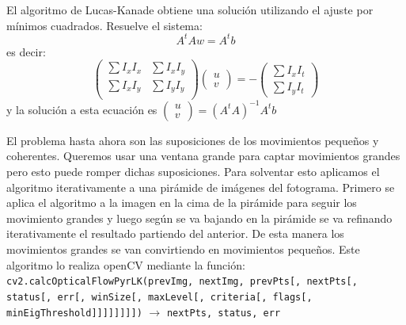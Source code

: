 \documentclass[a4paper,openright, 12pt]{book}
\begin{document}
El algoritmo de Lucas-Kanade obtiene una solución utilizando el ajuste por mínimos cuadrados. Resuelve el sistema:
\begin{equation*}
A^t Aw=A^t b
\end{equation*}
es decir:
\begin{equation*}
\left(
\begin{matrix}
\sum I_x I_x & \sum I_x I_y\\
\sum I_x I_y & \sum I_y I_y\\
\end{matrix}
\right)
\left(\begin{array}{c}u\\v\end{array}\right)
=
- \left(\begin{array}{c} \sum I_x I_t\\ \sum I_y I_t\end{array}\right)
\end{equation*}
y la solución a esta ecuación es $\left(\begin{array}{c}u\\v\end{array}\right) = (A^t A)^{-1} A^t b $  

El problema hasta ahora son las suposiciones de los movimientos pequeños y coherentes. Queremos usar una ventana grande para captar movimientos grandes pero esto puede romper dichas suposiciones. Para solventar esto aplicamos el algoritmo iterativamente a una pirámide de imágenes del fotograma. Primero se aplica el algoritmo a la imagen en la cima de la pirámide para seguir los movimiento grandes y luego según se va bajando en la pirámide se va refinando iterativamente el resultado partiendo del anterior. De esta manera los movimientos grandes se van convirtiendo en movimientos pequeños.
\newline
Este algoritmo lo realiza openCV mediante la función: \newline
\lstinline|cv2.calcOpticalFlowPyrLK(prevImg, nextImg, prevPts[, nextPts[, status[, err[, winSize[, maxLevel[, criteria[, flags[, minEigThreshold]]]]]]]])|
$\rightarrow$  \lstinline|nextPts, status, err|
\newline
\end{document}
